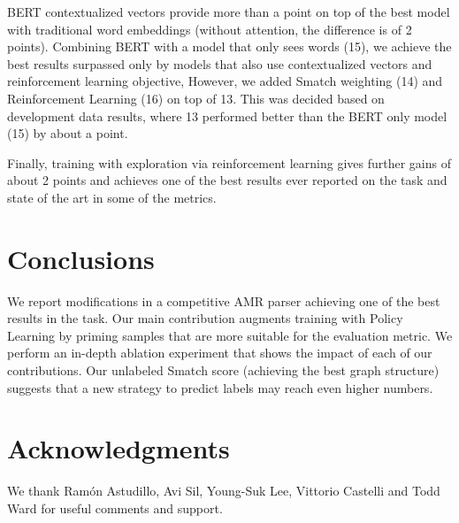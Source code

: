 \documentclass[11pt,a4paper]{article}
\begin{document}
BERT contextualized vectors provide more than a point on top of the best model with traditional word embeddings (without attention, the difference is of 2 points). Combining BERT with a model that only sees words (15), we achieve the best results surpassed only by models that also use contextualized vectors and reinforcement learning objective, However, we added Smatch weighting (14) and Reinforcement Learning (16) on top of 13. This was decided based on development data results, where 13 performed better than the BERT only model (15) by about a point. 

Finally, training with exploration via reinforcement learning gives further gains of about 2 points and achieves one of the best results ever reported on the task and state of the art in some of the metrics.




\section{Conclusions}

We report modifications in a competitive AMR parser achieving one of the best results in the task. Our main contribution augments training with Policy Learning by priming samples that are more suitable for the evaluation metric. We perform an in-depth ablation experiment that shows the impact of each of our contributions. Our unlabeled Smatch score (achieving the best graph structure) suggests that a new strategy to predict labels may reach even higher numbers.

\section*{Acknowledgments}
We thank Ram\'on Astudillo, Avi Sil, Young-Suk Lee, Vittorio Castelli and Todd Ward for useful comments and support.



\end{document}
